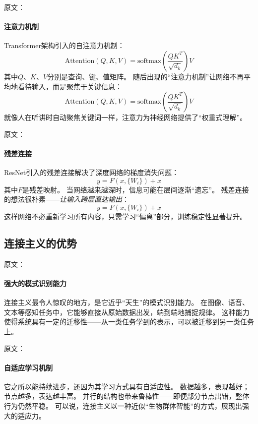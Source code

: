 原文：
\paragraph{注意力机制}
Transformer架构引入的自注意力机制：
$$\text{Attention}(Q, K, V) = \text{softmax}\left(\frac{QK^T}{\sqrt{d_k}}\right)V$$
其中$Q$、$K$、$V$分别是查询、键、值矩阵。
随后出现的“注意力机制”让网络不再平均地看待输入，而是聚焦于关键信息：  
$$\text{Attention}(Q, K, V) = \text{softmax}\left(\frac{QK^T}{\sqrt{d_k}}\right)V$$
就像人在听讲时自动聚焦关键词一样，注意力为神经网络提供了“权重式理解”。

原文：
\paragraph{残差连接}
ResNet引入的残差连接解决了深度网络的梯度消失问题：
$$y = F(x, \{W_i\}) + x$$
其中$F$是残差映射。
当网络越来越深时，信息可能在层间逐渐“遗忘”。  
残差连接的想法很朴素——\emph{让输入跨层直达输出}：
$$y = F(x, \{W_i\}) + x$$
这样网络不必重新学习所有内容，只需学习“偏离”部分，训练稳定性显著提升。

\subsection{连接主义的优势}

原文：
\paragraph{强大的模式识别能力}
连接主义最令人惊叹的地方，是它近乎“天生”的模式识别能力。  
在图像、语音、文本等感知任务中，它能够直接从原始数据出发，端到端地捕捉规律。  
这种能力使得系统具有一定的迁移性——从一类任务学到的表示，可以被迁移到另一类任务上。

原文：
\paragraph{自适应学习机制}
它之所以能持续进步，还因为其学习方式具有自适应性。  
数据越多，表现越好；节点越多，表达越丰富。  
并行的结构也带来鲁棒性——即便部分节点出错，整体行为仍然平稳。  
可以说，连接主义以一种近似“生物群体智能”的方式，展现出强大的适应力。

